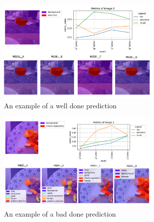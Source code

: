 \documentclass[a4paper,10pt]{report}
\begin{document}
\begin{figure}[h]
    \centering
    \includegraphics[width=0.7\textwidth]{assets/img/mod_image0.jpg}
    \caption{An example of a well done prediction}
    \label{fig:result0}
\end{figure}

\clearpage 

\begin{figure}[h]
    \centering
    \includegraphics[width=0.7\textwidth]{assets/img/result2.png}
    \caption{An example of a bad done prediction}
    \label{fig:result1}
\end{figure}


\end{document}
